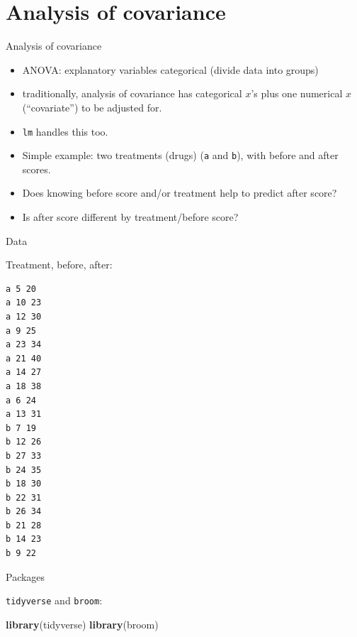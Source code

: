 \documentclass[ignorenonframetext,]{beamer}
\newenvironment{Shaded}{\begin{snugshade}}{\end{snugshade}}
\newcommand{\KeywordTok}[1]{\textcolor[rgb]{0.13,0.29,0.53}{\textbf{#1}}}
\newcommand{\NormalTok}[1]{#1}
\begin{document}
\hypertarget{analysis-of-covariance}{%
\section{Analysis of covariance}\label{analysis-of-covariance}}

\begin{frame}[fragile]{Analysis of covariance}
\protect\hypertarget{analysis-of-covariance-1}{}

\begin{itemize}
\item
  ANOVA: explanatory variables categorical (divide data into groups)
\item
  traditionally, analysis of covariance has categorical \(x\)'s plus one
  numerical \(x\) (``covariate'') to be adjusted for.
\item
  \texttt{lm} handles this too.
\item
  Simple example: two treatments (drugs) (\texttt{a} and \texttt{b}),
  with before and after scores.
\item
  Does knowing before score and/or treatment help to predict after
  score?
\item
  Is after score different by treatment/before score?
\end{itemize}

\end{frame}

\begin{frame}[fragile]{Data}
\protect\hypertarget{data-1}{}

Treatment, before, after:

\scriptsize

\begin{verbatim}
a 5 20
a 10 23
a 12 30
a 9 25
a 23 34
a 21 40
a 14 27
a 18 38
a 6 24
a 13 31
b 7 19
b 12 26
b 27 33
b 24 35
b 18 30
b 22 31
b 26 34
b 21 28
b 14 23
b 9 22
\end{verbatim}

\normalsize

\end{frame}

\begin{frame}[fragile]{Packages}
\protect\hypertarget{packages-3}{}

\texttt{tidyverse} and \texttt{broom}:

\begin{Shaded}
\begin{Highlighting}[]
\KeywordTok{library}\NormalTok{(tidyverse)}
\KeywordTok{library}\NormalTok{(broom)}
\end{Highlighting}
\end{Shaded}

\end{frame}
\end{document}
